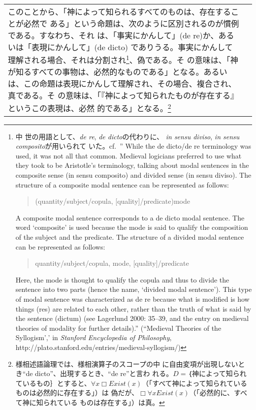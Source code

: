 \documentclass[10pt]{jsarticle} %
\begin{document}
\begin{longtable}{p{21em}p{21em}}
このことから、「神によって知られるすべてのものは、存在することが必然で
ある」という命題は、次のように区別されるのが慣例である。すなわち、それ
は、「事実にかんして」(de re)か、あるいは「表現にかんして」(de dicto)
でありうる。事実にかんして理解される場合、それは分割され\footnote {中
世の用語として、{\itshape de re}, {\itshape de dicto}の代わりに、
{\itshape in sensu diviso}, {\itshape in sensu composito}が用いられて
いた。cf.~'' While the de dicto/de re terminology was used, it was not
all that common. Medieval logicians preferred to use what they took to
be Aristotle's terminology, talking about modal sentences in the
composite sense (in sensu composito) and divided sense (in sensu
diviso). The structure of a composite modal sentence can be
represented as follows:
\begin{quote}
   (quantity/subject/copula, [quality]/predicate)mode
\end{quote}
A composite modal sentence corresponds to a de dicto modal
sentence. The word ‘composite’ is used because the mode is said to
qualify the composition of the subject and the predicate. The
structure of a divided modal sentence can be represented as follows:
\begin{quote}
quantity/subject/copula, mode, [quality]/predicate
\end{quote}
Here, the mode is thought to qualify the copula and thus to divide the
sentence into two parts (hence the name, ‘divided modal
sentence’). This type of modal sentence was characterized as de re
because what is modified is how things (res) are related to each
other, rather than the truth of what is said by the sentence (dictum)
(see Lagerlund 2000: 35–39, and the entry on medieval theories of
modality for further details).'' (``Medieval Theories of the
Syllogism',' in {\itshape Stanford Encyclopedia of Philosophy},
http://plato.stanford.edu/entries/medieval-syllogism/) }、偽である。そ
の意味は、「神が知るすべての事物は、必然的なものである」となる。あるい
は、この命題は表現にかんして理解され、その場合、複合され、真である。そ
の意味は、「『神によって知られたものが存在する』というこの表現は、必然
的である」となる。\footnote{様相述語論理では、様相演算子のスコープの中
に自由変項が出現しないとき``de dicto''、出現するとき、``de re''と言わ
れる。$D = $｛神によって知られているもの｝とすると、$\forall x \Box
Exist(x)$（「すべて神によって知られているものは必然的に存在する」）は
偽だが、$\Box \forall x Exist(x)$（「必然的に、すべて神に知られている
ものは存在する」）は真。}


\\


\end{longtable}
\end{document}
